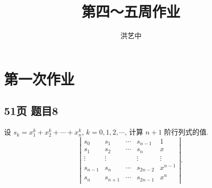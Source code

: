 \title{第四～五周作业}
\author{洪艺中}
\maketitle
\section{第一次作业}
\subsection*{51页 题目8}
\begin{problem}
设 $s_k = x_1^k + x_2^k + \cdots + x_n^k$, $k = 0, 1, 2, \cdots$, 计算 $n + 1$ 阶行列式的值.
\[
\left|
\begin{matrix}
    s_0 & s_1 & \cdots & s_{n - 1} & 1 \\
    s_1 & s_2 & \cdots & s_{n}     & x \\
    \vdots & \vdots &  & \vdots & \vdots \\
    s_{n - 1} & s_n & \cdots & s_{2n - 2} & x^{n - 1} \\
    s_{n} & s_{n + 1} & \cdots & s_{2n - 1} & x^{n}
\end{matrix}
\right|.
\]
\end{problem}
